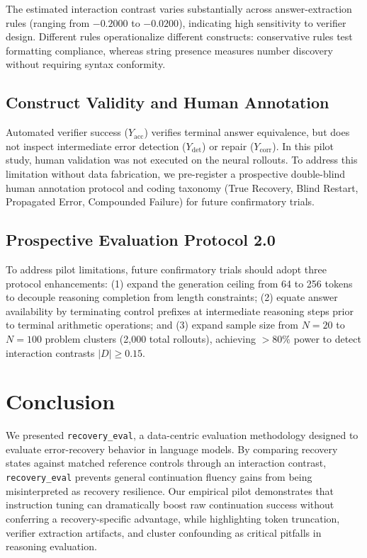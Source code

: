 \documentclass[conference]{IEEEtran}
\begin{document}
The estimated interaction contrast varies substantially across answer-extraction rules (ranging from $-0.2000$ to $-0.0200$), indicating high sensitivity to verifier design. Different rules operationalize different constructs: conservative rules test formatting compliance, whereas string presence measures number discovery without requiring syntax conformity.

\subsection{Construct Validity and Human Annotation}
Automated verifier success ($Y_{\text{acc}}$) verifies terminal answer equivalence, but does not inspect intermediate error detection ($Y_{\text{det}}$) or repair ($Y_{\text{corr}}$). In this pilot study, human validation was not executed on the neural rollouts. To address this limitation without data fabrication, we pre-register a prospective double-blind human annotation protocol and coding taxonomy (True Recovery, Blind Restart, Propagated Error, Compounded Failure) for future confirmatory trials.

\subsection{Prospective Evaluation Protocol 2.0}
To address pilot limitations, future confirmatory trials should adopt three protocol enhancements: (1) expand the generation ceiling from 64 to 256 tokens to decouple reasoning completion from length constraints; (2) equate answer availability by terminating control prefixes at intermediate reasoning steps prior to terminal arithmetic operations; and (3) expand sample size from $N=20$ to $N=100$ problem clusters (2,000 total rollouts), achieving $>80\%$ power to detect interaction contrasts $|D| \ge 0.15$.

\section{Conclusion}
We presented \texttt{recovery\_eval}, a data-centric evaluation methodology designed to evaluate error-recovery behavior in language models. By comparing recovery states against matched reference controls through an interaction contrast, \texttt{recovery\_eval} prevents general continuation fluency gains from being misinterpreted as recovery resilience. Our empirical pilot demonstrates that instruction tuning can dramatically boost raw continuation success without conferring a recovery-specific advantage, while highlighting token truncation, verifier extraction artifacts, and cluster confounding as critical pitfalls in reasoning evaluation.

\vspace{-1.5mm}


\end{document}
